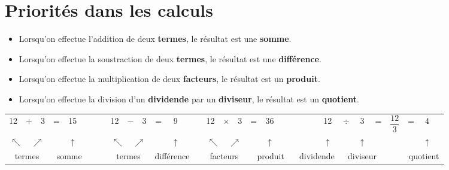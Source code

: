 \section{Priorités dans les calculs}

\begin{definition}
   \begin{itemize}
      \item Lorsqu'on effectue l'addition de deux {\bf termes}, le résultat est une {\bf somme}.
      \item Lorsqu'on effectue la soustraction de deux {\bf termes}, le résultat est une {\bf différence}.
      \item Lorsqu'on effectue la multiplication de deux {\bf facteurs}, le résultat est un {\bf produit}.
      \item Lorsqu'on effectue la division d'un {\bf dividende} par un {\bf diviseur}, le résultat est un {\bf quotient}. \\ [-10mm]
   \end{itemize}
\end{definition}

\bigskip

{\setlength{\tabcolsep}{4.5pt}
\begin{tabular}{*{7}{c}|*{7}{c}|*{8}{c}|*{10}{c}}
   12 & $+$ & 3 & = &15 &&&& 12 & $-$ & 3 & = & 9 &&& 12 & $\times$ & 3 & = & 36 &&&&& 12 & $\div$ & 3  & = & $\dfrac{12}{3}$ & = & 4 & \\
   \multicolumn{3}{c}{$\nwarrow \quad \nearrow$} & & $\uparrow$ &&&& \multicolumn{3}{c}{$\nwarrow \quad \nearrow$} & & $\uparrow$ &&& \multicolumn{3}{c}{$\nwarrow \quad \nearrow$} & & $\uparrow$ &&&&& $\uparrow$ & & $\uparrow$ & & & & $\uparrow$ & \\
   \multicolumn{3}{c}{\small termes} & \multicolumn{3}{c}{\small somme} &&& \multicolumn{3}{c}{\small termes} & \multicolumn{3}{c|}{\small différence} && \multicolumn{3}{c}{\small facteurs} & \multicolumn{4}{c|}{\small produit} & \multicolumn{3}{c}{\small dividende} & \multicolumn{3}{c}{\small diviseur} & & \multicolumn{3}{c}{\small quotient} \\
\end{tabular}}

\bigskip

